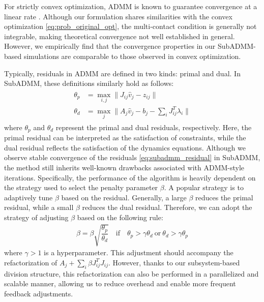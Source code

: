 \documentclass[lettersize,journal]{IEEEtran}
\begin{document}
For strictly convex optimization, ADMM is known to guarantee convergence at a linear rate \cite{boyd2011distributed}. 
Although our formulation shares similarities with the convex optimization \eqref{eq:prob_original_opt}, the multi-contact condition is generally not integrable, making theoretical convergence not well established in general. However, we empirically find that the convergence properties in our SubADMM-based simulations are comparable to those observed in convex optimization.

Typically, residuals in ADMM are defined in two kinds: primal and dual. 
In SubADMM, these definitions similarly hold as follows:
\begin{align} \label{eq:subadmm_residual}
\begin{split}
\theta_p &= \max_{i,j} \| J_{ij}\hat{v}_j - z_{ij} \| \\
\theta_d &= \max_j \| A_j\hat{v}_j - b_j -\sum_i J_{ij}^T\lambda_i \|
\end{split}
\end{align}
where $\theta_p$ and $\theta_d$ represent the primal and dual residuals, respectively. Here, the primal residual can be interpreted as the satisfaction of constraints, while the dual residual reflects the satisfaction of the dynamics equations.
Although we observe stable convergence of the residuals \eqref{eq:subadmm_residual} in SubADMM, the method still inherits well-known drawbacks associated with ADMM-style iterations. Specifically, the performance of the algorithm is heavily dependent on the strategy used to select the penalty parameter $\beta$.
A popular strategy is to adaptively tune $\beta$ based on the residual. Generally, a large $\beta$ reduces the primal residual, while a small $\beta$ reduces the dual residual.
Therefore, we can adopt the strategy of adjusting $\beta$ based on the following rule:
\begin{align} \label{eq:subadmm_update_beta}
    \beta = \beta \sqrt{\dfrac{\theta_p}{\theta_d}} \quad \text{if} \quad \theta_p>\gamma\theta_d~\text{or}~\theta_d>\gamma\theta_p
\end{align}
where $\gamma > 1$ is a hyperparameter.
This adjustment should accompany the refactorization of $A_j + \sum_{i} \beta J_{ij}^TJ_{ij}$. 
However, thanks to our subsystem-based division structure, this refactorization can also be performed in a parallelized and scalable manner, allowing us to reduce overhead and enable more frequent feedback adjustments.
\end{document}
